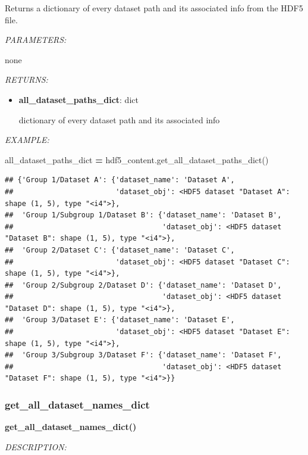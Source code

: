 \documentclass[
]{article}
\newenvironment{Shaded}{\begin{snugshade}}{\end{snugshade}}
\newcommand{\NormalTok}[1]{#1}
\newcommand{\OperatorTok}[1]{\textcolor[rgb]{0.81,0.36,0.00}{\textbf{#1}}}
\begin{document}
Returns a dictionary of every dataset path and its associated info from the HDF5 file.

\emph{PARAMETERS:}

none

\emph{RETURNS:}

\begin{itemize}
\item
  \textbf{all\_dataset\_paths\_dict}: dict

  dictionary of every dataset path and its associated info
\end{itemize}

\emph{EXAMPLE:}

\begin{Shaded}
\begin{Highlighting}[]
\NormalTok{all_dataset_paths_dict }\OperatorTok{=}\NormalTok{ hdf5_content.get_all_dataset_paths_dict()}
\end{Highlighting}
\end{Shaded}

\begin{verbatim}
## {'Group 1/Dataset A': {'dataset_name': 'Dataset A',
##                        'dataset_obj': <HDF5 dataset "Dataset A": shape (1, 5), type "<i4">},
##  'Group 1/Subgroup 1/Dataset B': {'dataset_name': 'Dataset B',
##                                   'dataset_obj': <HDF5 dataset "Dataset B": shape (1, 5), type "<i4">},
##  'Group 2/Dataset C': {'dataset_name': 'Dataset C',
##                        'dataset_obj': <HDF5 dataset "Dataset C": shape (1, 5), type "<i4">},
##  'Group 2/Subgroup 2/Dataset D': {'dataset_name': 'Dataset D',
##                                   'dataset_obj': <HDF5 dataset "Dataset D": shape (1, 5), type "<i4">},
##  'Group 3/Dataset E': {'dataset_name': 'Dataset E',
##                        'dataset_obj': <HDF5 dataset "Dataset E": shape (1, 5), type "<i4">},
##  'Group 3/Subgroup 3/Dataset F': {'dataset_name': 'Dataset F',
##                                   'dataset_obj': <HDF5 dataset "Dataset F": shape (1, 5), type "<i4">}}
\end{verbatim}

\hypertarget{get_all_dataset_names_dict}{%
\subsubsection{get\_all\_dataset\_names\_dict}\label{get_all_dataset_names_dict}}

\textbf{get\_all\_dataset\_names\_dict()}

\emph{DESCRIPTION:}
\end{document}
